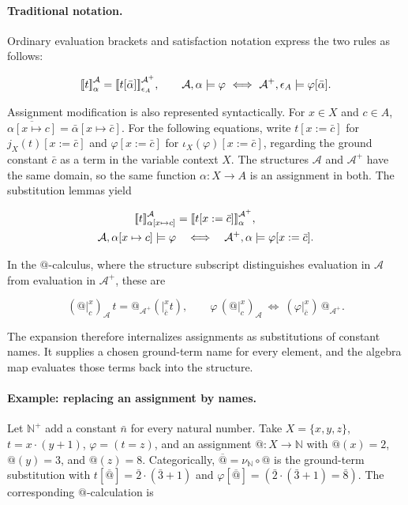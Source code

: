 \documentclass[11pt]{article}
\makeatletter
\newcommand{\llbracket}{\mathopen{[\mkern-3mu[}}
\newcommand{\rrbracket}{\mathclose{]\mkern-3mu]}}
\newcommand{\atsign}{\mathord{@}}
\theoremstyle{definition}
\makeatother
\begin{document}
\paragraph{Traditional notation.}
Ordinary evaluation brackets and satisfaction notation express the two rules
as follows:

\[
\llbracket t\rrbracket^{\mathcal A}_\alpha
=\llbracket t[\bar\alpha]\rrbracket^{\mathcal A^+}_{\epsilon_A},
\qquad
\mathcal A,\alpha\models\varphi
\ \Longleftrightarrow\ 
\mathcal A^+,\epsilon_A\models\varphi[\bar\alpha].
\]

Assignment modification is also represented syntactically. For \(x\in X\) and
\(c\in A\),
\(\overline{\alpha[x\mapsto c]}=\bar\alpha[x\mapsto\bar c]\). For the
following equations, write \(t[x:=\bar c]\) for \(j_X(t)[x:=\bar c]\) and
\(\varphi[x:=\bar c]\) for \(\iota_X(\varphi)[x:=\bar c]\), regarding the
ground constant \(\bar c\) as a term in the variable context \(X\). The
structures \(\mathcal A\) and \(\mathcal A^+\) have the same domain, so the
same function \(\alpha:X\to A\) is an assignment in both. The substitution
lemmas yield

\[
\begin{aligned}
\llbracket t\rrbracket^{\mathcal A}_{\alpha[x\mapsto c]}
&=\llbracket t[x:=\bar c]\rrbracket^{\mathcal A^+}_\alpha,\\
\mathcal A,\alpha[x\mapsto c]\models\varphi
&\quad\Longleftrightarrow\quad
\mathcal A^+,\alpha\models\varphi[x:=\bar c].
\end{aligned}
\]

In the \(\atsign\)-calculus, where the structure subscript distinguishes
evaluation in \(\mathcal A\) from evaluation in \(\mathcal A^+\), these are

\[
\boxed{
(\atsign\vert_c^x)_{\mathcal A}\,t
=\atsign_{\mathcal A^+}(\vert_{\bar c}^x t),
\qquad
\varphi\,(\atsign\vert_c^x)_{\mathcal A}
\ \Longleftrightarrow\ 
(\varphi\vert_{\bar c}^x)\,\atsign_{\mathcal A^+}.
}
\]

The expansion therefore internalizes assignments as substitutions of
constant names. It supplies a chosen ground-term name for every element, and
the algebra map evaluates those terms back into the structure.

\paragraph{Example: replacing an assignment by names.}
Let \(\mathbb N^+\) add a constant \(\bar n\) for every natural number.
Take \(X=\{x,y,z\}\), \(t=x\cdot(y+1)\),
\(\varphi=(t=z)\), and an assignment \(\atsign:X\to\mathbb N\) with
\(\atsign(x)=2\), \(\atsign(y)=3\), and \(\atsign(z)=8\). Categorically,
\(\overline{\atsign}=\nu_{\mathbb N}\circ\atsign\) is the ground-term
substitution with
\(t[\overline{\atsign}]=\bar2\cdot(\bar3+1)\) and
\(\varphi[\overline{\atsign}]=
(\bar2\cdot(\bar3+1)=\bar8)\). The corresponding \(\atsign\)-calculation is
\end{document}
